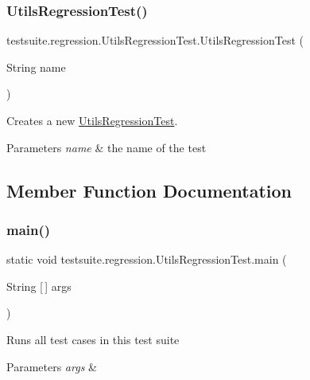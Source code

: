 \subsubsection{\texorpdfstring{Utils\+Regression\+Test()}{UtilsRegressionTest()}}
{\footnotesize\ttfamily testsuite.\+regression.\+Utils\+Regression\+Test.\+Utils\+Regression\+Test (\begin{DoxyParamCaption}\item[{String}]{name }\end{DoxyParamCaption})}

Creates a new \mbox{\hyperlink{classtestsuite_1_1regression_1_1_utils_regression_test}{Utils\+Regression\+Test}}.


\begin{DoxyParams}{Parameters}
{\em name} & the name of the test \\
\hline
\end{DoxyParams}


\subsection{Member Function Documentation}
\mbox{\label{classtestsuite_1_1regression_1_1_utils_regression_test_a85edc67e921fc1bae46d247aa21bdfaf}} 
\subsubsection{\texorpdfstring{main()}{main()}}
{\footnotesize\ttfamily static void testsuite.\+regression.\+Utils\+Regression\+Test.\+main (\begin{DoxyParamCaption}\item[{String \mbox{[}$\,$\mbox{]}}]{args }\end{DoxyParamCaption})\hspace{0.3cm}{\ttfamily [static]}}

Runs all test cases in this test suite


\begin{DoxyParams}{Parameters}
{\em args} & \\
\hline
\end{DoxyParams}
\mbox{\label{classtestsuite_1_1regression_1_1_utils_regression_test_a29ccb38cafacb3d15f1610080cdc2d8a}} 
